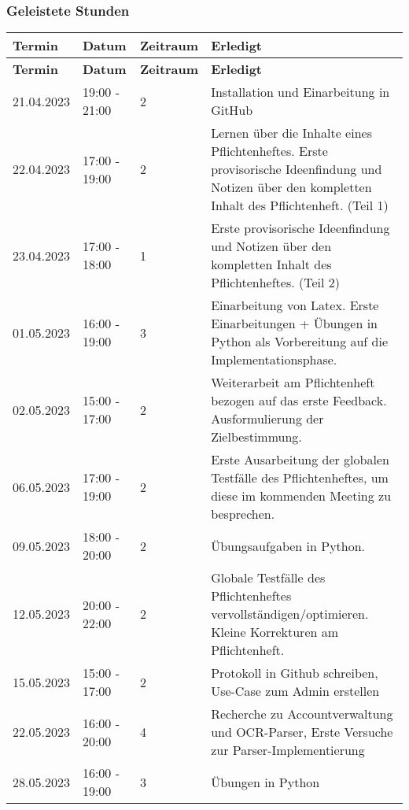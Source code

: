 \subsubsection{Geleistete Stunden}
\begin{flushleft}
		\begin{longtable}{p{2cm}p{}p{2cm}p{}}
            \toprule
            \textbf{Termin} & \textbf{Datum} & \textbf{Zeitraum} & \textbf{Erledigt}\\
            \midrule\endfirsthead
            \toprule
            \textbf{Termin} & \textbf{Datum} & \textbf{Zeitraum} & \textbf{Erledigt}\\
            \midrule\endhead
            21.04.2023 & 19:00 - 21:00 & 2 & Installation und Einarbeitung in GitHub\\ \midrule
		    22.04.2023 & 17:00 - 19:00 & 2 & Lernen über die Inhalte eines Pflichtenheftes. Erste provisorische Ideenfindung und Notizen über den kompletten Inhalt des Pflichtenheft. (Teil 1) \\ \midrule
		    23.04.2023 & 17:00 - 18:00 & 1 & Erste provisorische Ideenfindung und Notizen über den kompletten Inhalt des Pflichtenheftes. (Teil 2) \\ \midrule
		    01.05.2023 & 16:00 - 19:00 & 3 & Einarbeitung von Latex. Erste Einarbeitungen + Übungen in Python als Vorbereitung auf die Implementationsphase. \\ \midrule
	 	    02.05.2023 & 15:00 - 17:00 & 2 & Weiterarbeit am Pflichtenheft bezogen auf das erste Feedback. Ausformulierung der Zielbestimmung.  \\ \midrule
            06.05.2023 & 17:00 - 19:00 & 2 & Erste Ausarbeitung der globalen Testfälle des Pflichtenheftes, um diese im kommenden Meeting zu besprechen. \\ \midrule
            09.05.2023 & 18:00 - 20:00 & 2 & Übungsaufgaben in Python. \\ \midrule
            12.05.2023 & 20:00 - 22:00 & 2 & Globale Testfälle des Pflichtenheftes vervollständigen/optimieren. Kleine Korrekturen am Pflichtenheft. \\  \midrule
            15.05.2023 & 15:00 - 17:00 & 2 & Protokoll in Github schreiben, Use-Case zum Admin erstellen \\  \midrule
            22.05.2023 & 16:00 - 20:00 & 4 & Recherche zu Accountverwaltung und OCR-Parser, Erste Versuche zur Parser-Implementierung \\  \midrule
            28.05.2023 & 16:00 - 19:00 & 3 & Übungen in Python \\  \midrule

\end{longtable}
\end{flushleft}
